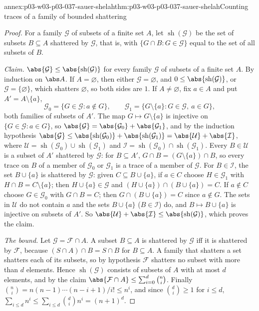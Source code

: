 \begin{annexitem}{annex:p03-w03-p03-037-sauer-shelah}{thm:p03-w03-p03-037-sauer-shelah}{Counting traces of a family of bounded shattering}
\begin{proof}
For a family \(\mathcal G\) of subsets of a finite set \(A\), let
\(\operatorname{sh}(\mathcal G)\) be the set of subsets \(B\subseteq A\)
shattered by \(\mathcal G\), that is, with
\(\{G\cap B:G\in\mathcal G\}\) equal to the set of all subsets of \(B\).

\emph{Claim.}  \(\abs{\mathcal G}\leq\abs{\operatorname{sh}(\mathcal G)}\)
for every family \(\mathcal G\) of subsets of a finite set \(A\).  By
induction on \(\abs A\).  If \(A=\varnothing\), then either
\(\mathcal G=\varnothing\), and \(0\leq\abs{\operatorname{sh}(\mathcal G)}\),
or \(\mathcal G=\{\varnothing\}\), which shatters \(\varnothing\), so both
sides are \(1\).  If \(A\neq\varnothing\), fix \(a\in A\) and put
\(A'=A\setminus\{a\}\),
\[
\mathcal G_0=\{G\in\mathcal G:a\notin G\},\qquad
\mathcal G_1=\{G\setminus\{a\}:G\in\mathcal G,\ a\in G\},
\]
both families of subsets of \(A'\).  The map \(G\mapsto G\setminus\{a\}\) is
injective on \(\{G\in\mathcal G:a\in G\}\), so
\(\abs{\mathcal G}=\abs{\mathcal G_0}+\abs{\mathcal G_1}\), and by the
induction hypothesis
\(\abs{\mathcal G}\leq\abs{\operatorname{sh}(\mathcal G_0)}+
\abs{\operatorname{sh}(\mathcal G_1)}=\abs{\mathcal U}+\abs{\mathcal I}\), where
\(\mathcal U=\operatorname{sh}(\mathcal G_0)\cup\operatorname{sh}(\mathcal G_1)\)
and
\(\mathcal I=\operatorname{sh}(\mathcal G_0)\cap\operatorname{sh}(\mathcal G_1)\).
Every \(B\in\mathcal U\) is a subset of \(A'\) shattered by \(\mathcal G\):
for \(B\subseteq A'\), \(G\cap B=(G\setminus\{a\})\cap B\), so every trace on
\(B\) of a member of \(\mathcal G_0\) or \(\mathcal G_1\) is a trace of a member
of \(\mathcal G\).  For \(B\in\mathcal I\), the set \(B\cup\{a\}\) is shattered
by \(\mathcal G\): given \(C\subseteq B\cup\{a\}\), if \(a\in C\) choose
\(H\in\mathcal G_1\) with \(H\cap B=C\setminus\{a\}\); then
\(H\cup\{a\}\in\mathcal G\) and \((H\cup\{a\})\cap(B\cup\{a\})=C\).  If
\(a\notin C\) choose \(G\in\mathcal G_0\) with \(G\cap B=C\); then
\(G\cap(B\cup\{a\})=C\) since \(a\notin G\).  The sets in \(\mathcal U\) do
not contain \(a\) and the sets \(B\cup\{a\}\) (\(B\in\mathcal I\)) do, and
\(B\mapsto B\cup\{a\}\) is injective on subsets of \(A'\).  So
\(\abs{\mathcal U}+\abs{\mathcal I}\leq\abs{\operatorname{sh}(\mathcal G)}\),
which proves the claim.

\emph{The bound.}  Let \(\mathcal G=\mathcal F\cap A\).  A subset
\(B\subseteq A\) is shattered by \(\mathcal G\) iff it is shattered by
\(\mathcal F\), because \((S\cap A)\cap B=S\cap B\) for \(B\subseteq A\).  A
family that shatters a set shatters each of its subsets, so by hypothesis
\(\mathcal F\) shatters no subset with more than \(d\) elements.  Hence
\(\operatorname{sh}(\mathcal G)\) consists of subsets of \(A\) with at most
\(d\) elements, and by the claim
\(\abs{\mathcal F\cap A}\leq\sum_{i=0}^{d}\binom ni\).  Finally
\(\binom ni=n(n-1)\cdots(n-i+1)/i!\leq n^i\), and since
\(\binom di\geq1\) for \(i\leq d\),
\(\sum_{i\leq d}n^i\leq\sum_{i\leq d}\binom di n^i=(n+1)^d\).
\end{proof}
\end{annexitem}


